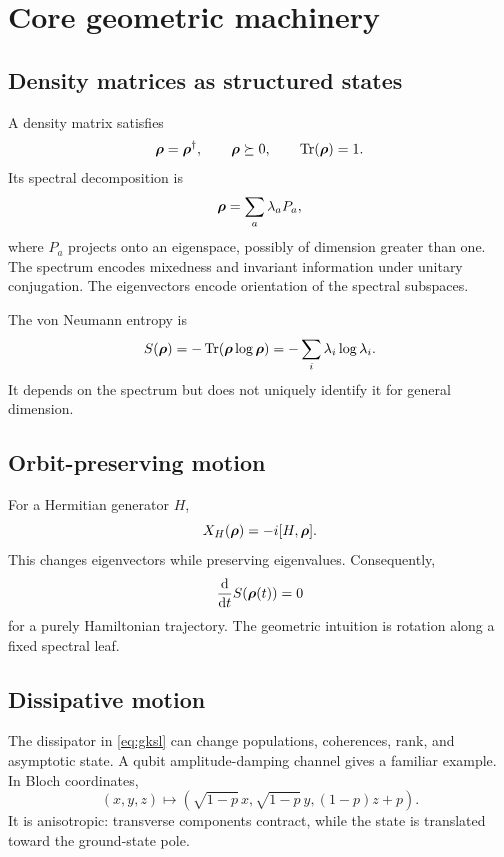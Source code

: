 \section{Core geometric machinery}

\subsection{Density matrices as structured states}

A density matrix satisfies
\[
\bm{\rho}=\bm{\rho}^\dagger,\qquad \bm{\rho}\succeq 0,\qquad \operatorname{Tr}(\bm{\rho})=1.
\]
Its spectral decomposition is
\[
\bm{\rho}=\sum_a \lambda_a P_a,
\]
where $P_a$ projects onto an eigenspace, possibly of dimension greater than one. The spectrum encodes mixedness and invariant information under unitary conjugation. The eigenvectors encode orientation of the spectral subspaces.

The von Neumann entropy is
\begin{equation}
S(\bm{\rho})=-\operatorname{Tr}(\bm{\rho}\log\bm{\rho})=-\sum_i\lambda_i\log\lambda_i.
\label{eq:entropy}
\end{equation}
It depends on the spectrum but does not uniquely identify it for general dimension.

\subsection{Orbit-preserving motion}

For a Hermitian generator $H$,
\[
X_H(\bm{\rho})=-i[H,\bm{\rho}].
\]
This changes eigenvectors while preserving eigenvalues. Consequently,
\[
\frac{\mathrm{d}}{\mathrm{d} t}S(\bm{\rho}(t))=0
\]
for a purely Hamiltonian trajectory. The geometric intuition is rotation along a fixed spectral leaf.

\subsection{Dissipative motion}

The dissipator in \cref{eq:gksl} can change populations, coherences, rank, and asymptotic state. A qubit amplitude-damping channel gives a familiar example. In Bloch coordinates,
\[
(x,y,z)\mapsto \left(\sqrt{1-p}\,x,\sqrt{1-p}\,y,(1-p)z+p\right).
\]
It is anisotropic: transverse components contract, while the state is translated toward the ground-state pole.

